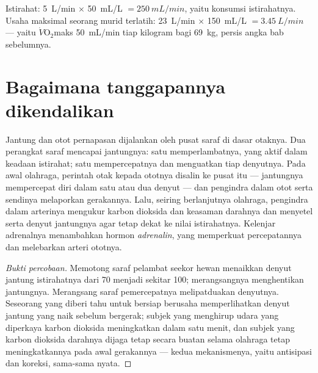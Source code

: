 \begin{example}\label{ex:g10:heart-lungs-effort:fick}
Istirahat: \qty{5}{L/min} $\times$ \qty{50}{mL/L} $= \qty{250}{mL/min}$,
yaitu konsumsi istirahatnya. Usaha maksimal seorang murid terlatih:
\qty{23}{L/min} $\times$ \qty{150}{mL/L} $= \qty{3.45}{L/min}$ --- yaitu
$\dot V\!\mathrm{O_2}$maks \qty{50}{mL/min} tiap kilogram bagi
\qty{69}{kg}, persis angka bab sebelumnya.
\end{example}

\section{Bagaimana tanggapannya dikendalikan}

\begin{proposition}\label{prop:g10:heart-lungs-effort:control}
Jantung dan otot pernapasan dijalankan oleh pusat saraf di dasar
otaknya. Dua perangkat saraf mencapai jantungnya: satu memperlambatnya,
yang aktif dalam keadaan istirahat; satu mempercepatnya dan menguatkan
tiap denyutnya. Pada awal olahraga, perintah otak kepada ototnya
disalin ke pusat itu --- jantungnya mempercepat diri dalam satu atau dua
denyut --- dan pengindra dalam otot serta sendinya melaporkan
gerakannya. Lalu, seiring berlanjutnya olahraga, pengindra dalam
arterinya mengukur karbon dioksida dan keasaman darahnya dan menyetel
 serta denyut jantungnya agar tetap dekat ke nilai
istirahatnya. Kelenjar adrenalnya menambahkan hormon
\emph{adrenalin}, yang memperkuat percepatannya dan
melebarkan arteri ototnya.
\end{proposition}
\begin{proof}[Bukti percobaan]
Memotong saraf pelambat seekor hewan menaikkan denyut jantung
istirahatnya dari 70 menjadi sekitar 100; merangsangnya menghentikan
jantungnya. Merangsang saraf pemercepatnya melipatduakan denyutnya.
Seseorang yang diberi tahu untuk bersiap berusaha memperlihatkan denyut
jantung yang naik sebelum bergerak; subjek yang menghirup udara yang
diperkaya karbon dioksida meningkatkan  dalam satu menit,
dan subjek yang karbon dioksida darahnya dijaga tetap secara buatan
selama olahraga tetap meningkatkannya pada awal gerakannya --- kedua
mekanismenya, yaitu antisipasi dan koreksi, sama-sama nyata.
\end{proof}

